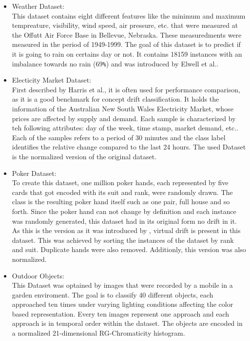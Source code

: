 \documentclass[12pt,oneside,a4paper,parskip]{scrbook}
\begin{document}
\begin{itemize}
  \item Weather Dataset: \\
        This dataset contains eight different features like the minimum and maximum tempreature, visibility, wind speed, 
        air pressure, etc. that were measured at the Offutt Air Force Base in Bellevue, Nebraska. These measuredments were
        measured in the period of 1949-1999. The goal of this dataset is to predict if it is going to rain on certains day or not.
        It contains 18159 instances with an imbalance towards no rain (69\verb|%|) and was introduced by Elwell et al..

  \item Electicity Market Dataset:\\
        First described by Harris et al., it is often used for performance comparison, as it is a good benchmark for concept drift 
        classification. It holds the information of the Australian New South Wales Electricity Market, whose prices are affected 
        by supply and demand. Each sample is characterized by teh following attributes: day of the week, time stamp, market demand,
        etc.. Each of the samples refers to a period of 30 minutes and the class label identiﬁes the relative change compared to the
        last 24 hours. The used Dataset is the normalized version of the original dataset.

  \item Poker Dataset: \\
        To create this dataset, one million poker hands, each represented by five cards that got encoded with its suit and rank, 
        were randomly drawn. The class is the resulting poker hand itself such as one pair, full house and so forth.
        Since the poker hand can not change by definition and each instance was randomly generated, this dataset had 
        in its original form no drift in it.
        As this is the version as it was introduced by \cite{bifet2013efficient}, virtual drift is present in this dataset. 
        This was achieved by sorting the instances of the dataset by rank and suit. Duplicate hands were also removed.
        Additionly, this version was also normalized.

  \item Outdoor Objects: \\
        This Dataset was optained by images that were recorded by a mobile in a garden enviroment. The goal is to classify 40 different objects,
        each approached ten times under varying lighting conditions affecting the color based representation.
        Every ten images represent one approach and each approach is in temporal order within the dataset.
        The objects are encoded in a normalized 21-dimensional RG-Chromaticity histogram.

\end{itemize}
\end{document}
